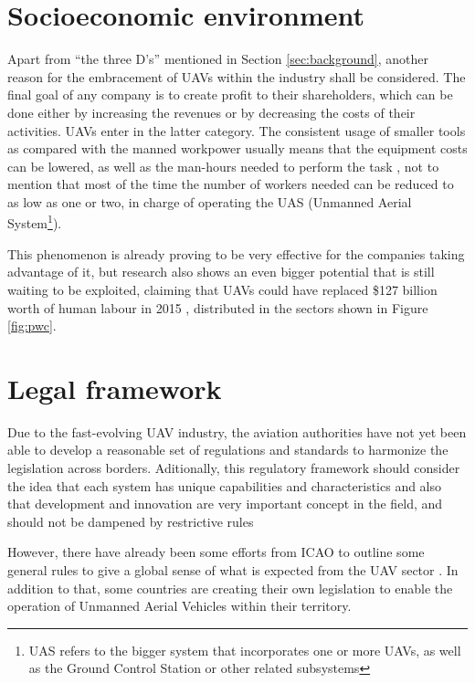 \section{Socioeconomic environment}

Apart from ``the three D's'' mentioned in Section \ref{sec:background}, another reason for the embracement of UAVs within the industry shall be considered.
The final goal of any company is to create profit to their shareholders, which can be done either by increasing the revenues or by decreasing the costs of their activities.
UAVs enter in the latter category.
The consistent usage of smaller tools as compared with the manned workpower usually means that the equipment costs can be lowered, as well as the man-hours needed to perform the task \cite{airbusdemonstratesaircraftinspectionbydroneatfarnborough2016}, not to mention that most of the time the number of workers needed can be reduced to as low as one or two, in charge of operating the UAS (Unmanned Aerial System\footnote{UAS refers to the bigger system that incorporates one or more UAVs, as well as the Ground Control Station or other related subsystems}).

This phenomenon is already proving to be very effective for the companies taking advantage of it, but research also shows an even bigger potential that is still waiting to be exploited, claiming that UAVs could have replaced \$127 billion worth of human labour in 2015 \cite{wisniewski2016}, distributed in the sectors shown in Figure \ref{fig:pwc}.



\section{Legal framework}

Due to the fast-evolving UAV industry, the aviation authorities have not yet been able to develop a reasonable set of regulations and standards to harmonize the legislation across borders.
Aditionally, this regulatory framework should consider the idea that each system has unique capabilities and characteristics and also that development and innovation are very important concept in the field, and should not be dampened by restrictive rules \cite{valavanis2015}

However, there have already been some efforts from ICAO to outline some general rules to give a global sense of what is expected from the UAV sector \cite{manualonremotelypilotedaircraftsystemsrpas2015}. 
In addition to that, some countries are creating their own legislation to enable the operation of Unmanned Aerial Vehicles within their territory.

